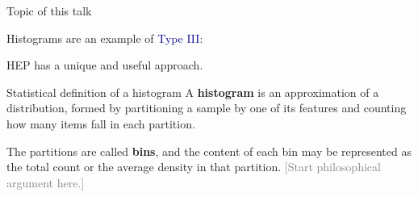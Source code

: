 \documentclass[aspectratio=169]{beamer}
\begin{document}
\begin{frame}{Topic of this talk}
\begin{center}
\Large Histograms are an example of \textcolor{darkblue}{Type III}:

\vspace{0.5 cm}
HEP has a unique and useful approach.
\end{center}
\end{frame}

\begin{frame}{Statistical definition of a histogram}
\vspace{0.75 cm}
A {\bf histogram} is an approximation of a distribution, formed by partitioning a sample by one of its features and counting how many items fall in each partition.

\vspace{0.25 cm}
The partitions are called {\bf bins}, and the content of each bin may be represented as the total count or the average density in that partition. \textcolor{gray}{[Start philosophical argument here.]}

\begin{center}
\end{center}
\end{frame}
\end{document}
